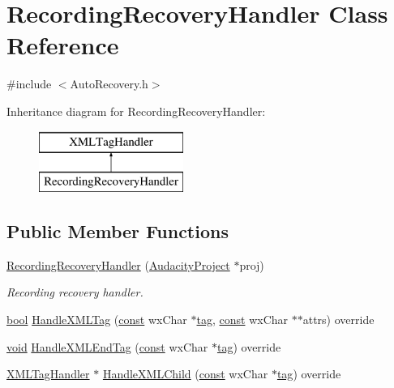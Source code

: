 \hypertarget{class_recording_recovery_handler}{}\section{Recording\+Recovery\+Handler Class Reference}
\label{class_recording_recovery_handler}


{\ttfamily \#include $<$Auto\+Recovery.\+h$>$}

Inheritance diagram for Recording\+Recovery\+Handler\+:\begin{figure}[H]
\begin{center}
\leavevmode
\includegraphics[height=2.000000cm]{class_recording_recovery_handler}
\end{center}
\end{figure}
\subsection*{Public Member Functions}
\begin{DoxyCompactItemize}
\item 
\hyperlink{class_recording_recovery_handler_a7aa278c738b74452eca6d024bfc9799a}{Recording\+Recovery\+Handler} (\hyperlink{class_audacity_project}{Audacity\+Project} $\ast$proj)
\begin{DoxyCompactList}\small\item\em Recording recovery handler. \end{DoxyCompactList}\item 
\hyperlink{mac_2config_2i386_2lib-src_2libsoxr_2soxr-config_8h_abb452686968e48b67397da5f97445f5b}{bool} \hyperlink{class_recording_recovery_handler_a93a7a0a1b8f02a71e52a601430fb36b6}{Handle\+X\+M\+L\+Tag} (\hyperlink{getopt1_8c_a2c212835823e3c54a8ab6d95c652660e}{const} wx\+Char $\ast$\hyperlink{structtag}{tag}, \hyperlink{getopt1_8c_a2c212835823e3c54a8ab6d95c652660e}{const} wx\+Char $\ast$$\ast$attrs) override
\item 
\hyperlink{sound_8c_ae35f5844602719cf66324f4de2a658b3}{void} \hyperlink{class_recording_recovery_handler_a275ecf21dfbe1fc8da1b574ad17629f1}{Handle\+X\+M\+L\+End\+Tag} (\hyperlink{getopt1_8c_a2c212835823e3c54a8ab6d95c652660e}{const} wx\+Char $\ast$\hyperlink{structtag}{tag}) override
\item 
\hyperlink{class_x_m_l_tag_handler}{X\+M\+L\+Tag\+Handler} $\ast$ \hyperlink{class_recording_recovery_handler_a7a0bc9d2dd838e9f74385d9481db5256}{Handle\+X\+M\+L\+Child} (\hyperlink{getopt1_8c_a2c212835823e3c54a8ab6d95c652660e}{const} wx\+Char $\ast$\hyperlink{structtag}{tag}) override
\end{DoxyCompactItemize}



